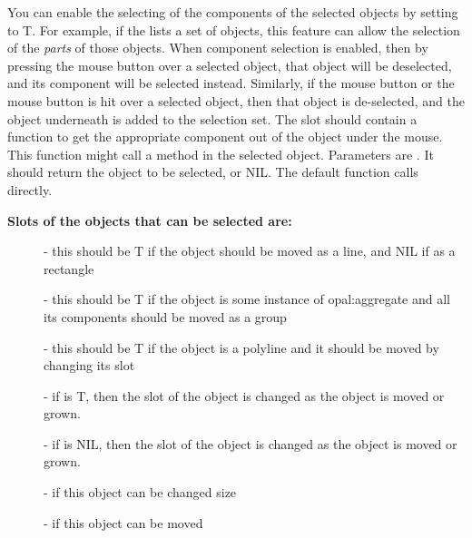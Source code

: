 You can enable the selecting of the components of the selected
objects by setting  to T.
For example, if the  lists a set of
objects, this feature can allow the selection of the {\it parts} of
those objects.  When component selection is enabled, then by pressing
the  mouse button over a selected object,
that object will be deselected, and its component will be selected
instead.  Similarly, if the  mouse button or the
 mouse button is hit
over a selected object, then that object is de-selected, and the
object underneath is added to the selection set.   The slot
 should contain a function to get the
appropriate component out of the object under the mouse.  This
function might call a method in the selected object.  Parameters are
.  It should return the object to be selected, or
NIL.  The default function calls  directly.


{\bf Slots of the objects that can be selected are:}

\begin{description}
\item[]     - this should be T if the object should be moved as a line,
                  and NIL if as a rectangle

\item[]     - this should be T if the object is some instance of
                   opal:aggregate and all its components should be moved as
                   a group

\item[]     - this should be T if the object is a polyline and it should
                     be moved by changing its  slot

\item[]     - if  is T, then the  slot of the
                  object is changed as the object is moved or grown.

\item[]     - if  is NIL, then the  slot of the object is
               changed as the object is moved or grown.

\item[]     - if this object can be changed size

\item[]     - if this object can be moved
\end{description}

